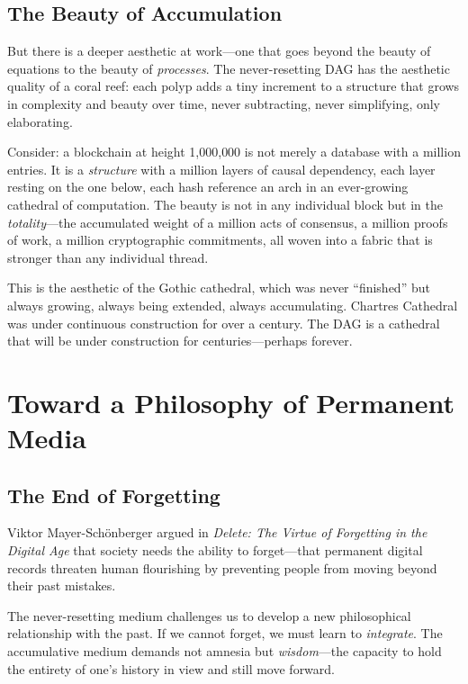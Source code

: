 \documentclass[12pt,a4paper]{article}
\theoremstyle{philosophical}
\begin{document}
\subsection{The Beauty of Accumulation}

But there is a deeper aesthetic at work---one that goes beyond the beauty of equations to the beauty of \emph{processes}. The never-resetting DAG has the aesthetic quality of a coral reef: each polyp adds a tiny increment to a structure that grows in complexity and beauty over time, never subtracting, never simplifying, only elaborating.

Consider: a blockchain at height 1,000,000 is not merely a database with a million entries. It is a \emph{structure} with a million layers of causal dependency, each layer resting on the one below, each hash reference an arch in an ever-growing cathedral of computation. The beauty is not in any individual block but in the \emph{totality}---the accumulated weight of a million acts of consensus, a million proofs of work, a million cryptographic commitments, all woven into a fabric that is stronger than any individual thread.

This is the aesthetic of the Gothic cathedral, which was never ``finished'' but always growing, always being extended, always accumulating. Chartres Cathedral was under continuous construction for over a century. The DAG is a cathedral that will be under construction for centuries---perhaps forever.

\section{Toward a Philosophy of Permanent Media}

\subsection{The End of Forgetting}

Viktor Mayer-Sch\"onberger argued in \emph{Delete: The Virtue of Forgetting in the Digital Age} that society needs the ability to forget---that permanent digital records threaten human flourishing by preventing people from moving beyond their past mistakes.

The never-resetting medium challenges us to develop a new philosophical relationship with the past. If we cannot forget, we must learn to \emph{integrate}. The accumulative medium demands not amnesia but \emph{wisdom}---the capacity to hold the entirety of one's history in view and still move forward.
\end{document}
